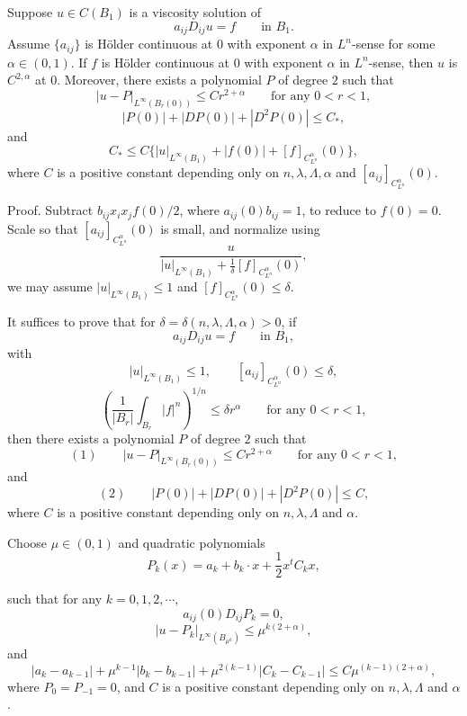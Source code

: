 \begin{theorem}\label{hanlin:ch05-thm-5-20} Suppose $u\in C(B_1)$ is a viscosity solution of
\[
a_{ij}D_{ij}u=f \qquad \text{in } B_1.
\]
Assume $\{a_{ij}\}$ is Hölder continuous at $0$ with exponent $\alpha$ in $L^n$-sense for some
$\alpha\in(0,1)$. If $f$ is Hölder continuous at $0$ with exponent $\alpha$ in $L^n$-sense, then $u$ is
$C^{2,\alpha}$ at $0$. Moreover, there exists a polynomial $P$ of degree $2$ such that
\[
|u-P|_{L^\infty(B_r(0))}\le Cr^{2+\alpha} \qquad \text{for any } 0<r<1,
\]
\[
|P(0)|+|DP(0)|+|D^2P(0)|\le C_*,
\]
and
\[
C_*\le C\{|u|_{L^\infty(B_1)}+|f(0)|+[f]_{C^\alpha_{L^n}}(0)\},
\]
where $C$ is a positive constant depending only on $n,\lambda,\Lambda,\alpha$ and $[a_{ij}]_{C^\alpha_{L^n}}(0)$.
\end{theorem}

Proof. \sketch Subtract $b_{ij}x_ix_jf(0)/2$, where $a_{ij}(0)b_{ij}=1$, to reduce to $f(0)=0$. Scale so that $[a_{ij}]_{C^\alpha_{L^n}}(0)$ is small, and normalize using
\[
\frac{u}{|u|_{L^\infty(B_1)}+\frac{1}{\delta}[f]_{C^\alpha_{L^n}}(0)},
\]
we may assume $|u|_{L^\infty(B_1)}\le 1$ and $[f]_{C^\alpha_{L^n}}(0)\le \delta$.

It suffices to prove that for $\delta=\delta(n,\lambda,\Lambda,\alpha)>0$, if
\[
a_{ij}D_{ij}u=f \qquad \text{in } B_1,
\]
with
\[
|u|_{L^\infty(B_1)}\le 1,\qquad [a_{ij}]_{C^\alpha_{L^n}}(0)\le \delta,
\]
\[
\left(\frac{1}{|B_r|}\int_{B_r}|f|^n\right)^{1/n}\le \delta r^\alpha \qquad \text{for any } 0<r<1,
\]
then there exists a polynomial $P$ of degree $2$ such that
\[
(1)\qquad |u-P|_{L^\infty(B_r(0))}\le Cr^{2+\alpha} \qquad \text{for any } 0<r<1,
\]
and
\[
(2)\qquad |P(0)|+|DP(0)|+|D^2P(0)|\le C,
\]
where $C$ is a positive constant depending only on $n,\lambda,\Lambda$ and $\alpha$.

Choose $\mu\in(0,1)$ and quadratic polynomials
\[
P_k(x)=a_k+b_k\cdot x+\frac12 x^tC_kx,
\]

such that for any $k = 0,1,2,\cdots,$
\[
a_{ij}(0)D_{ij}P_k = 0,
\]
\begin{equation}\tag{3}
\lvert u - P_k\rvert_{L^\infty(B_{\mu^k})} \le \mu^{k(2+\alpha)},
\end{equation}
and
\begin{equation}\tag{4}
\lvert a_k - a_{k-1}\rvert + \mu^{k-1}\lvert b_k - b_{k-1}\rvert + \mu^{2(k-1)}\lvert C_k - C_{k-1}\rvert \le C\mu^{(k-1)(2+\alpha)},
\end{equation}
where $P_0 = P_{-1} = 0$, and $C$ is a positive constant depending only on $n,\lambda,\Lambda$ and $\alpha$.

